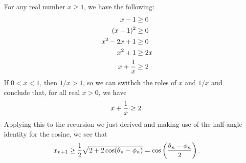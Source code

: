 \documentclass[12pt]{article}
\begin{document}
For any real number $x \ge 1$, we have the following:
\begin{align*}
x - 1 &\ge 0 \\
(x - 1)^2 &\ge 0 \\
x^2 - 2 x + 1 &\ge 0 \\
x^2 + 1 &\ge 2x \\
x + {1 \over x} &\ge 2
\end{align*}
If $0 < x < 1$, then $1/x > 1$, so we can swithch the roles of $x$ and $1/x$ and
conclude that, for all real $x > 0$, we have
\[
x + {1 \over x} \ge 2 .
\]
Applying this to the recursion we just derived and making use of the half-angle
identity for the cosine, we see that
\[
x_{n+1} \ge
{1 \over 2}
\sqrt{2 + 2 \cos (\theta_n - \phi_n)} =
\cos \left( {\theta_n - \phi_n \over 2} \right) . 
\]
\end{document}
